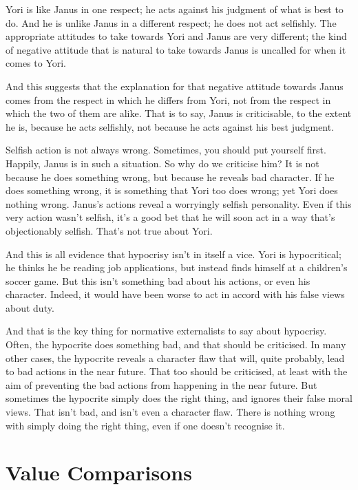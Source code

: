 \documentclass[
  10pt,
  letterpaper,
  twoside]{scrbook}
\begin{document}
{Yori} is like {Janus} in one respect; he acts against his judgment of
what is best to do. And he is unlike {Janus} in a different respect; he
does not act selfishly. The appropriate attitudes to take towards {Yori}
and {Janus} are very different; the kind of negative attitude that is
natural to take towards {Janus} is uncalled for when it comes to {Yori}.

And this suggests that the explanation for that negative attitude
towards {Janus} comes from the respect in which he differs from {Yori},
not from the respect in which the two of them are alike. That is to say,
{Janus} is criticisable, to the extent he is, because he acts selfishly,
not because he acts against his best judgment.

Selfish action is not always wrong. Sometimes, you should put yourself
first. Happily, {Janus} is in such a situation. So why do we criticise
him? It is not because he does something wrong, but because he reveals
bad character. If he does something wrong, it is something that {Yori}
too does wrong; yet {Yori} does nothing wrong. {Janus}'s actions reveal
a worryingly selfish personality. Even if this very action wasn't
selfish, it's a good bet that he will soon act in a way that's
objectionably selfish. That's not true about {Yori}.

And this is all evidence that hypocrisy isn't in itself a vice. {Yori}
is hypocritical; he thinks he be reading job applications, but instead
finds himself at a children's soccer game. But this isn't something bad
about his actions, or even his character. Indeed, it would have been
worse to act in accord with his false views about duty.

And that is the key thing for normative externalists to say about
hypocrisy. Often, the hypocrite does something bad, and that should be
criticised. In many other cases, the hypocrite reveals a character flaw
that will, quite probably, lead to bad actions in the near future. That
too should be criticised, at least with the aim of preventing the bad
actions from happening in the near future. But sometimes the hypocrite
simply does the right thing, and ignores their false moral views. That
isn't bad, and isn't even a character flaw. There is nothing wrong with
simply doing the right thing, even if one doesn't recognise it.

\section{Value Comparisons}\label{valuecomparisons}
\end{document}
